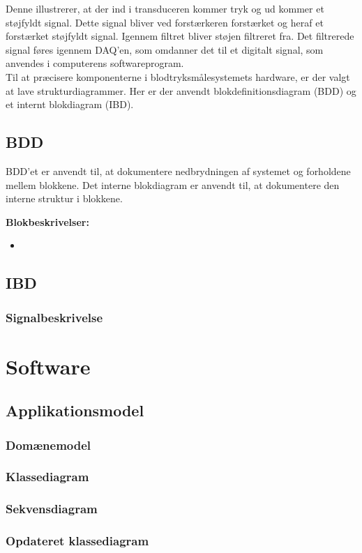 Denne illustrerer, at der ind i transduceren kommer tryk og ud kommer et støjfyldt signal. Dette signal bliver ved forstærkeren forstærket og heraf et forstærket støjfyldt signal. Igennem filtret bliver støjen filtreret fra. Det filtrerede signal føres igennem DAQ’en, som omdanner det til et digitalt signal, som anvendes i computerens softwareprogram.\\
\newline
Til at præcisere komponenterne i blodtryksmålesystemets hardware, er der valgt at lave strukturdiagrammer. Her er der anvendt blokdefinitionsdiagram (BDD) og et internt blokdiagram (IBD).\\
\newline 

\subsection{BDD}
BDD'et er anvendt til, at dokumentere nedbrydningen af systemet og forholdene mellem blokkene. Det interne blokdiagram er anvendt til, at dokumentere den interne struktur i blokkene. 

\textbf{Blokbeskrivelser:}
\begin{itemize}
\item 
\end{itemize}
\subsection{IBD}
\subsubsection{Signalbeskrivelse}

\section{Software}
\subsection{Applikationsmodel}
\subsubsection{Domænemodel}
\subsubsection{Klassediagram}
\subsubsection{Sekvensdiagram}
\subsubsection{Opdateret klassediagram}
